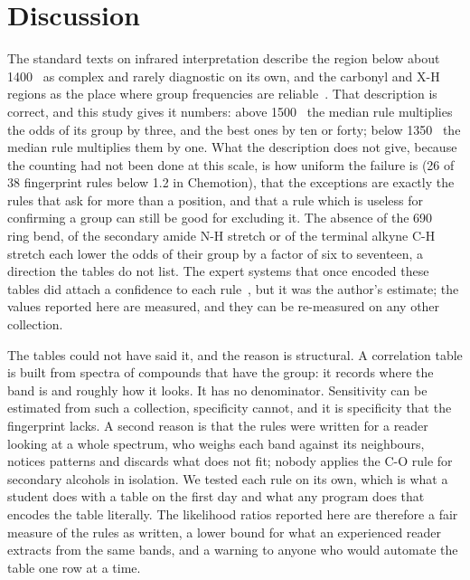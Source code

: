 \section{Discussion}
\label{sec:discussion}

The standard texts on infrared interpretation describe the region below about 1400~\wn{} as complex and rarely diagnostic on its own, and the carbonyl and X-H regions as the place where group frequencies are reliable~\cite{colthup1990introduction,bellamy1975infrared}. That description is correct, and this study gives it numbers: above 1500~\wn{} the median rule multiplies the odds of its group by three, and the best ones by ten or forty; below 1350~\wn{} the median rule multiplies them by one. What the description does not give, because the counting had not been done at this scale, is how uniform the failure is (26 of 38 fingerprint rules below 1.2 in Chemotion), that the exceptions are exactly the rules that ask for more than a position, and that a rule which is useless for confirming a group can still be good for excluding it. The absence of the 690~\wn{} ring bend, of the secondary amide N-H stretch or of the terminal alkyne C-H stretch each lower the odds of their group by a factor of six to seventeen, a direction the tables do not list. The expert systems that once encoded these tables did attach a confidence to each rule~\cite{woodruff1980pairs,andreev1996expirs}, but it was the author's estimate; the values reported here are measured, and they can be re-measured on any other collection.

The tables could not have said it, and the reason is structural. A correlation table is built from spectra of compounds that have the group: it records where the band is and roughly how it looks. It has no denominator. Sensitivity can be estimated from such a collection, specificity cannot, and it is specificity that the fingerprint lacks. A second reason is that the rules were written for a reader looking at a whole spectrum, who weighs each band against its neighbours, notices patterns and discards what does not fit; nobody applies the C-O rule for secondary alcohols in isolation. We tested each rule on its own, which is what a student does with a table on the first day and what any program does that encodes the table literally. The likelihood ratios reported here are therefore a fair measure of the rules as written, a lower bound for what an experienced reader extracts from the same bands, and a warning to anyone who would automate the table one row at a time.

